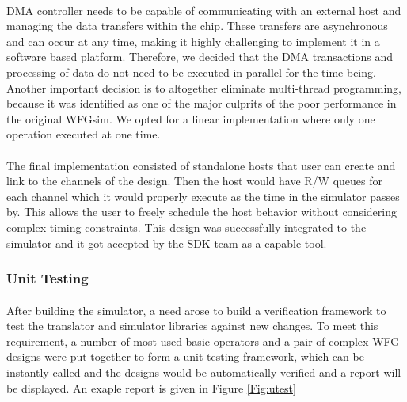 \paragraph{}
DMA controller needs to be capable of communicating with an external host and managing the data transfers within the chip. These transfers are asynchronous and can occur at any time, making it highly challenging to implement it in a software based platform. Therefore, we decided that the DMA transactions and processing of data do not need to be executed in parallel for the time being. Another important decision is to altogether eliminate multi-thread programming, because it was identified as one of the major culprits of the poor performance in the original WFGsim. We opted for a linear implementation where only one operation executed at one time.

\paragraph{}
The final implementation consisted of standalone hosts that user can create and link to the channels of the design. Then the host would have R/W queues for each channel which it would properly execute as the time in the simulator passes by. This allows the user to freely schedule the host behavior without considering complex timing constraints. This design was successfully integrated to the simulator and it got accepted by the SDK team as a capable tool.

\subsubsection{Unit Testing}
\label{sec:unittest}
\paragraph{}
After building the simulator, a need arose to build a verification framework to test the translator and simulator libraries against new changes. To meet this requirement, a number of most used basic operators and a pair of complex WFG designs were put together to form a unit testing framework, which can be instantly called and the designs would be automatically verified and a report will be displayed. An exaple report is given in Figure \ref{Fig:utest}

